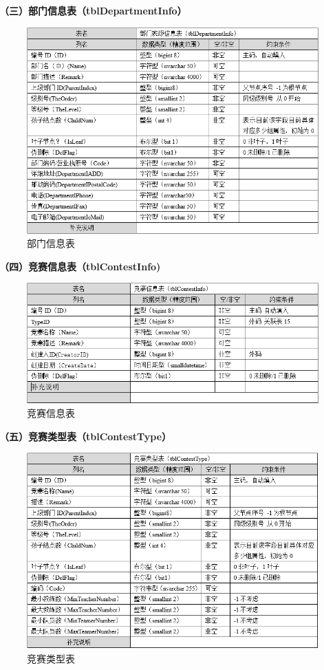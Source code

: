 \documentclass[a4paper]{ltxdoc}
\begin{document}
{		\textbf{（三）部门信息表（tblDepartmentInfo）}
		\begin{figure}[H]
			\centering
			\includegraphics[width=1.0\linewidth]{images/dbtable/tblDepartmentInfo.png}
			\caption{部门信息表}
		\end{figure}
		
		\textbf{（四）竞赛信息表（tblContestInfo)}
		\begin{figure}[H]
			\centering
			\includegraphics[width=1.0\linewidth]{images/dbtable/tblContestInfo.png}
			\caption{竞赛信息表}
		\end{figure}
		
		\textbf{（五）竞赛类型表（tblContestType）}
		\begin{figure}[H]
			\centering
			\includegraphics[width=1.0\linewidth]{images/dbtable/tblContestType.png}
			\caption{竞赛类型表}
		\end{figure}
		
}
\end{document}
